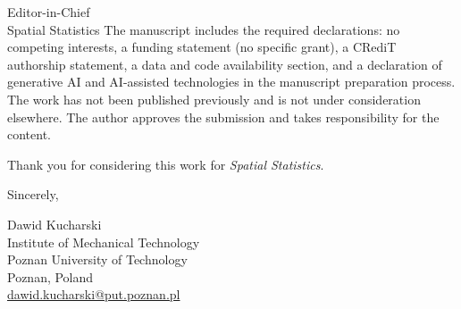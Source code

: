 \documentclass{letter}
\begin{document}
\begin{letter}{Editor-in-Chief\\
Spatial Statistics}
The manuscript includes the required declarations: no competing interests, a
funding statement (no specific grant), a CRediT authorship statement, a data
and code availability section, and a declaration of generative AI and
AI-assisted technologies in the manuscript preparation process. The work has
not been published previously and is not under consideration elsewhere. The
author approves the submission and takes responsibility for the content.

Thank you for considering this work for \emph{Spatial Statistics}.

\closing{Sincerely,}
Dawid Kucharski\\
Institute of Mechanical Technology\\
Poznan University of Technology\\
Poznan, Poland\\
\href{mailto:dawid.kucharski@put.poznan.pl}{dawid.kucharski@put.poznan.pl}
\end{letter}
\end{document}
